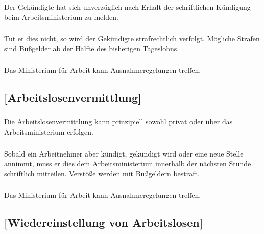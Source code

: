 \documentclass[a4paper, 11pt]{report}
\let\oldsubsection\subsection
\renewcommand{\subsection}{\leftskip=40pt\oldsubsection}
\begin{document}
 

\subsubsection{}
Der Gekündigte hat sich unverzüglich nach Erhalt der schriftlichen Kündigung beim Arbeitsministerium zu melden. 

\subsubsection{}
Tut er dies nicht, so wird der Gekündigte strafrechtlich verfolgt. Mögliche Strafen sind Bußgelder ab der Hälfte des bisherigen Tageslohns.

\subsubsection{}
Das Ministerium für Arbeit kann Ausnahmeregelungen treffen. 



\subsection{[Arbeitslosenvermittlung]}

 
\subsubsection{}
Die Arbeitslosenvermittlung kann prinzipiell sowohl privat oder über das Arbeitsministerium erfolgen.

\subsubsection{}
Sobald ein Arbeitnehmer aber kündigt, gekündigt wird oder eine neue Stelle annimmt, muss er dies dem Arbeitsministerium innerhalb der nächsten Stunde schriftlich mitteilen. Verstöße werden mit Bußgeldern bestraft.

\subsubsection{}
Das Ministerium für Arbeit kann Ausnahmeregelungen treffen. 

 

 
\subsection{[Wiedereinstellung von Arbeitslosen]}
\end{document}
